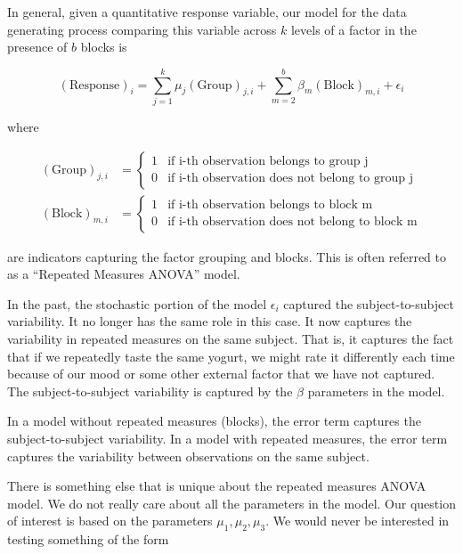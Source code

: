 \documentclass[
]{book}
\theoremstyle{plain}
\theoremstyle{mydefn}
\theoremstyle{myexmpl}
\theoremstyle{remark}
\begin{document}
\begin{rmdtip}
In general, given a quantitative response variable, our model for the data generating process comparing this variable across \(k\) levels of a factor in the presence of \(b\) blocks is

\[(\text{Response})_i = \sum_{j=1}^{k} \mu_j (\text{Group})_{j, i} + \sum_{m=2}^{b} \beta_m (\text{Block})_{m, i} + \epsilon_i\]

where

\[
\begin{aligned}
  (\text{Group})_{j,i} &= \begin{cases}
    1 & \text{if i-th observation belongs to group j} \\
    0 & \text{if i-th observation does not belong to group j}
    \end{cases} \\
  (\text{Block})_{m,i} &= \begin{cases}
    1 & \text{if i-th observation belongs to block m} \\
    0 & \text{if i-th observation does not belong to block m}
    \end{cases}
\end{aligned}
\]

are indicators capturing the factor grouping and blocks. This is often referred to as a ``Repeated Measures ANOVA'' model.
\end{rmdtip}

In the past, the stochastic portion of the model \(\epsilon_i\) captured the subject-to-subject variability. It no longer has the same role in this case. It now captures the variability in repeated measures on the same subject. That is, it captures the fact that if we repeatedly taste the same yogurt, we might rate it differently each time because of our mood or some other external factor that we have not captured. The subject-to-subject variability is captured by the \(\beta\) parameters in the model.

\begin{rmdkeyidea}
In a model without repeated measures (blocks), the error term captures the subject-to-subject variability. In a model with repeated measures, the error term captures the variability between observations on the same subject.
\end{rmdkeyidea}

There is something else that is unique about the repeated measures ANOVA model. We do not really care about all the parameters in the model. Our question of interest is based on the parameters \(\mu_1, \mu_2, \mu_3\). We would never be interested in testing something of the form
\end{document}
